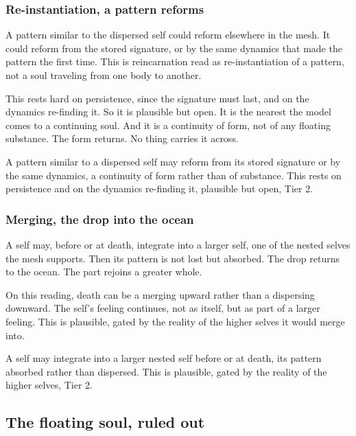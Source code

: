\subsubsection{Re-instantiation, a pattern reforms}

A pattern similar to the dispersed self could reform elsewhere in the mesh. It could reform from the stored signature, or by the same dynamics that made the pattern the first time. This is reincarnation read as re-instantiation of a pattern, not a soul traveling from one body to another.

This rests hard on persistence, since the signature must last, and on the dynamics re-finding it. So it is plausible but open. It is the nearest the model comes to a continuing soul. And it is a continuity of form, not of any floating substance. The form returns. No thing carries it across.

\begin{result}
A pattern similar to a dispersed self may reform from its stored signature or by the same dynamics, a continuity of form rather than of substance. This rests on persistence and on the dynamics re-finding it, plausible but open, Tier 2.
\end{result}

\subsubsection{Merging, the drop into the ocean}

A self may, before or at death, integrate into a larger self, one of the nested selves the mesh supports. Then its pattern is not lost but absorbed. The drop returns to the ocean. The part rejoins a greater whole.

On this reading, death can be a merging upward rather than a dispersing downward. The self's feeling continues, not as itself, but as part of a larger feeling. This is plausible, gated by the reality of the higher selves it would merge into.

\begin{result}
A self may integrate into a larger nested self before or at death, its pattern absorbed rather than dispersed. This is plausible, gated by the reality of the higher selves, Tier 2.
\end{result}

\subsection{The floating soul, ruled out}

